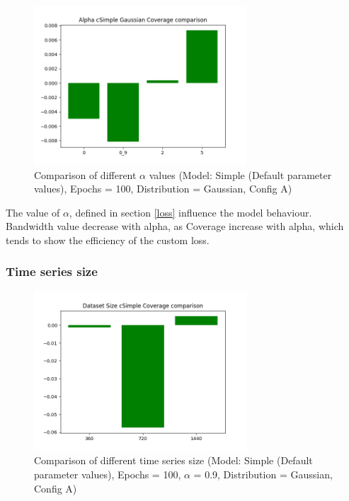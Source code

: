 \begin{figure}[!h]
    \centering
    \includegraphics[width=300px]{plots/hist/a/alpha/cSimple/Gaussian/Coverage.png}
    \caption{Comparison of different $\alpha$ values (Model: Simple (Default parameter values), Epochs = 100, Distribution = Gaussian, Config A)}
    \label{fig:comp2_alpha}
\end{figure}

The value of $\alpha$, defined in section \ref{loss} influence the model behaviour.
Bandwidth value decrease with alpha, as Coverage increase with alpha, which tends to show the efficiency of the custom loss.



\subsubsection{Time series size} \label{comp2_datasize}

\begin{figure}[H]
    \centering
    \includegraphics[width=300px]{plots/hist/a/datasize/cSimple/Coverage.png}
    \caption{Comparison of different time series size (Model: Simple (Default parameter values), Epochs = 100, $\alpha$ = 0.9, Distribution = Gaussian, Config A)}
    \label{fig:comp2_datasize}
\end{figure}


